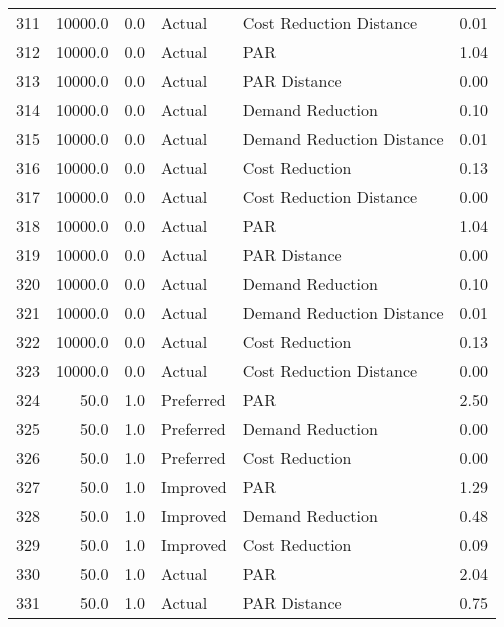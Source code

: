 \begin{longtable}{lrrllr}
311  &      10000.0 &     0.0 &         Actual &    Cost Reduction Distance &   0.01 \\
312  &      10000.0 &     0.0 &         Actual &                        PAR &   1.04 \\
313  &      10000.0 &     0.0 &         Actual &               PAR Distance &   0.00 \\
314  &      10000.0 &     0.0 &         Actual &           Demand Reduction &   0.10 \\
315  &      10000.0 &     0.0 &         Actual &  Demand Reduction Distance &   0.01 \\
316  &      10000.0 &     0.0 &         Actual &             Cost Reduction &   0.13 \\
317  &      10000.0 &     0.0 &         Actual &    Cost Reduction Distance &   0.00 \\
318  &      10000.0 &     0.0 &         Actual &                        PAR &   1.04 \\
319  &      10000.0 &     0.0 &         Actual &               PAR Distance &   0.00 \\
320  &      10000.0 &     0.0 &         Actual &           Demand Reduction &   0.10 \\
321  &      10000.0 &     0.0 &         Actual &  Demand Reduction Distance &   0.01 \\
322  &      10000.0 &     0.0 &         Actual &             Cost Reduction &   0.13 \\
323  &      10000.0 &     0.0 &         Actual &    Cost Reduction Distance &   0.00 \\
324  &         50.0 &     1.0 &      Preferred &                        PAR &   2.50 \\
325  &         50.0 &     1.0 &      Preferred &           Demand Reduction &   0.00 \\
326  &         50.0 &     1.0 &      Preferred &             Cost Reduction &   0.00 \\
327  &         50.0 &     1.0 &       Improved &                        PAR &   1.29 \\
328  &         50.0 &     1.0 &       Improved &           Demand Reduction &   0.48 \\
329  &         50.0 &     1.0 &       Improved &             Cost Reduction &   0.09 \\
330  &         50.0 &     1.0 &         Actual &                        PAR &   2.04 \\
331  &         50.0 &     1.0 &         Actual &               PAR Distance &   0.75 \\

\end{longtable}

